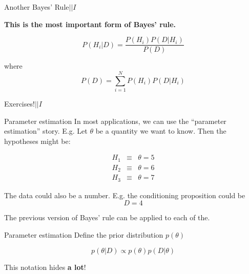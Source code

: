 \documentclass{beamer}
\begin{document}
\begin{frame}[t]{Another Bayes' Rule\hspace{170pt}$|| I$}

{\bf This is the most important form of Bayes' rule.}

\begin{equation}
P(H_i | D) = \frac{P(H_i)P(D|H_i)}{P(D)}
\end{equation}

where
\begin{equation}
P(D) = \sum_{i=1}^N P(H_i)P(D|H_i)
\end{equation}
\end{frame}


\begin{frame}[t]{Exercises!\hspace{170pt}$|| I$}
\end{frame}

\begin{frame}[t]{Parameter estimation}
In most applications, we can use the ``parameter estimation'' story. E.g.
Let $\theta$ be a quantity we want to know. Then the hypotheses might be:

\begin{eqnarray}
H_1 &\equiv& \theta = 5\\
H_2 &\equiv& \theta = 6\\
H_3 &\equiv& \theta = 7
\end{eqnarray}

The data could also be a number. E.g. the conditioning proposition could be
\begin{equation}
D = 4
\end{equation}

The previous version of Bayes' rule can be applied to each of the.
\end{frame}

\begin{frame}[t]{Parameter estimation}
Define the prior distribution $p(\theta)$


\begin{equation}
p(\theta | D) \propto p(\theta)p(D|\theta)
\end{equation}

This notation hides {\bf a lot}!
\end{frame}
\end{document}

